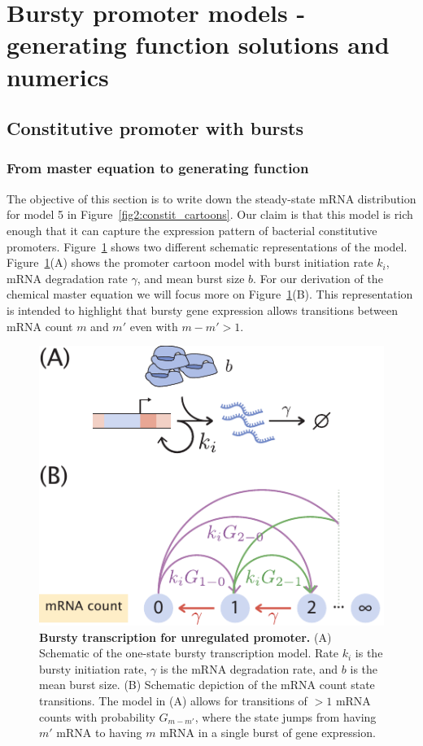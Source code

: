 \section{Bursty promoter models - generating function solutions and numerics}
\label{sec:gen_fcn_appdx}

\subsection{Constitutive promoter with bursts}

\subsubsection{From master equation to generating function}

The objective of this section is to write down the steady-state mRNA
distribution for model 5 in Figure~\ref{fig2:constit_cartoons}. Our claim is
that this model is rich enough that it can capture the expression pattern of
bacterial constitutive promoters. Figure~\ref{figS1:bursty_one_state} shows two
different schematic representations of the model.
Figure~\ref{figS1:bursty_one_state}(A) shows the promoter cartoon model with
burst initiation rate $k_i$, mRNA degradation rate $\gamma$, and mean burst size
$b$. For our derivation of the chemical master equation we will focus more on
Figure~\ref{figS1:bursty_one_state}(B). This representation is intended to
highlight that bursty gene expression allows transitions between mRNA count $m$
and $m'$ even with $m - m' > 1$.

\begin{figure}[h!]
\centering
\includegraphics{../figures/si/figS0X_bursty_states.pdf}
\caption{
\textbf{Bursty transcription for unregulated promoter.}
(A) Schematic of the one-state bursty transcription model. Rate $k_i$ is the
bursty initiation rate, $\gamma$ is the mRNA degradation rate, and $b$ is the
mean burst size. (B) Schematic depiction of the mRNA count state transitions.
The model in (A) allows for transitions of $> 1$ mRNA counts with probability
$G_{m-m'}$, where the state jumps from having $m'$ mRNA to having $m$ mRNA in a
single burst of gene expression.}
\label{figS1:bursty_one_state}
\end{figure}

